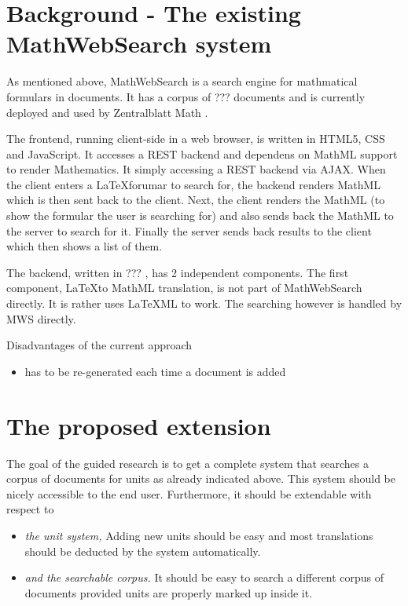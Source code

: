 \documentclass[11pt]{article}
\begin{document}
\section{Background - The existing MathWebSearch system}
\label{sec:mws}

As mentioned above, MathWebSearch is a search engine for mathmatical formulars in documents. It has a corpus of ??? documents  and is currently deployed and used by Zentralblatt Math .

The frontend, running client-side in a web browser, is written in HTML5, CSS and JavaScript. It accesses a REST backend and dependens on MathML support to render Mathematics. It simply accessing a REST backend via AJAX. When the client enters a \LaTeX forumar to search for, the backend renders MathML which is then sent back to the client. Next, the client renders the MathML (to show the formular the user is searching for) and also sends back the MathML to the server to search for it. Finally the server sends back results to the client which then shows a list of them.

The backend, written in ??? , has 2 independent components. The first component, \LaTeX to MathML translation, is not part of MathWebSearch directly. It is rather uses \LaTeX ML to work. The searching however is handled by MWS directly.



Disadvantages of the current approach
\begin{itemize}
  \item has to be re-generated each time a document is added
\end{itemize}

\section{The proposed extension}
\label{sec:extension}

The goal of the guided research is to get a complete system that searches a corpus of documents for units as already indicated above. This system should be nicely accessible to the end user. Furthermore, it should be extendable with respect to
\begin{itemize}
  \item \textit{the unit system, } Adding new units should be easy and most translations should be deducted by the system automatically.
  \item \textit{and the searchable corpus. } It should be easy to search a different corpus of documents provided units are properly marked up inside it.
\end{itemize}
\end{document}
